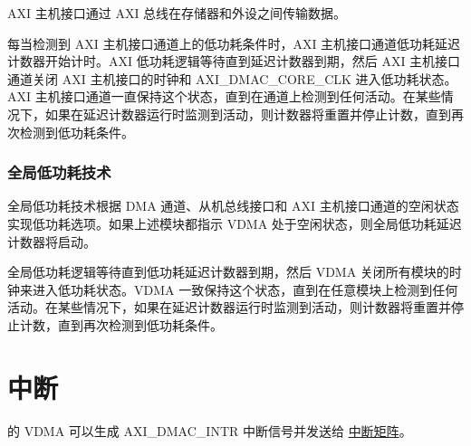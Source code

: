 \documentclass[main\_\_CN.tex]{subfiles}
\begin{document}
AXI 主机接口通过 AXI 总线在存储器和外设之间传输数据。

每当检测到 AXI 主机接口通道上的低功耗条件时，AXI 主机接口通道低功耗延迟计数器开始计时。AXI 低功耗逻辑等待直到延迟计数器到期，然后 AXI 主机接口通道关闭 AXI 主机接口的时钟和 AXI\_DMAC\_CORE\_CLK 进入低功耗状态。AXI 主机接口通道一直保持这个状态，直到在通道上检测到任何活动。在某些情况下，如果在延迟计数器运行时监测到活动，则计数器将重置并停止计数，直到再次检测到低功耗条件。

\subsubsection{全局低功耗技术}

全局低功耗技术根据 DMA 通道、从机总线接口和 AXI 主机接口通道的空闲状态实现低功耗选项。如果上述模块都指示 VDMA 处于空闲状态，则全局低功耗延迟计数器将启动。

全局低功耗逻辑等待直到低功耗延迟计数器到期，然后 VDMA 关闭所有模块的时钟来进入低功耗状态。VDMA 一致保持这个状态，直到在任意模块上检测到任何活动。在某些情况下，如果在延迟计数器运行时监测到活动，则计数器将重置并停止计数，直到再次检测到低功耗条件。


\section{中断}

\chipname{} 的 VDMA 可以生成 AXI\_DMAC\_INTR 中断信号并发送给 \hyperref[mod:intmtrx]{中断矩阵}。
\end{document}
